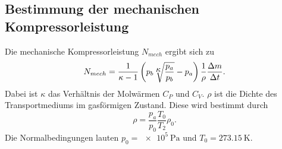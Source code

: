 \subsection{Bestimmung der mechanischen Kompressorleistung}
Die mechanische Kompressorleistung $N_{mech}$ ergibt sich zu
\begin{equation}
    N_{mech} = \frac{1}{\kappa - 1} \left(p_b \sqrt[\mathlarger{\mathlarger{\kappa}}]{\frac{p_a}{p_b}} - p_a\right)\frac{1}{\rho}\frac{\Delta m}{\Delta t}. %
    \label{eqn:nmech}
\end{equation}
Dabei ist $\kappa$ das Verhältnis der Molwärmen $C_P$ und $C_V$. $\rho$ ist die Dichte
des Transportmediums im gasförmigen Zustand. Diese wird bestimmt durch
\begin{equation}
    \rho = \frac{p_a}{p_0} \frac{T_0}{T_2} \rho_0.
    \label{eqn:dichte}
\end{equation}
Die Normalbedingungen lauten $p_0 = \SI{e5}{\pascal}$ und $T_0 = \SI{273.15}{\kelvin}$.
